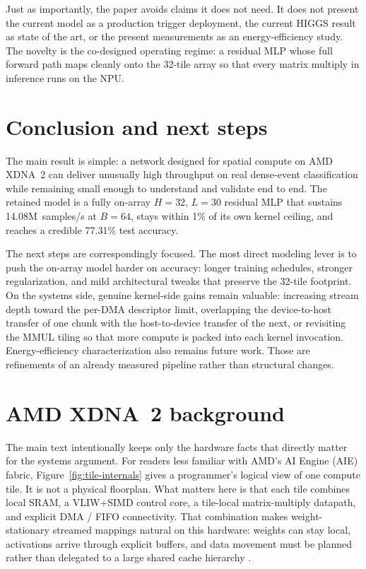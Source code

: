 \documentclass[a4paper,11pt]{article}
\begin{document}
Just as importantly, the paper avoids claims it does not need. It does not
present the current model as a production trigger deployment, the current HIGGS
result as state of the art, or the present measurements as an energy-efficiency
study. The novelty is the co-designed operating regime: a residual MLP whose
full forward path maps cleanly onto the 32-tile array so that every matrix
multiply in inference runs on the NPU.

\section{Conclusion and next steps}

The main result is simple: a network designed for spatial compute on AMD
XDNA~2 can deliver unusually high throughput on real dense-event
classification while remaining small enough to understand and validate end to
end. The retained model is a fully on-array $H=32$, $L=30$ residual MLP that
sustains 14.08M~samples/s at $B=64$, stays within 1\% of its own kernel
ceiling, and reaches a credible 77.31\% test accuracy.

The next steps are correspondingly focused. The most direct modeling lever is
to push the on-array model harder on accuracy: longer training schedules,
stronger regularization, and mild architectural tweaks that preserve the
32-tile footprint. On the systems side, genuine kernel-side gains remain
valuable: increasing stream depth toward the per-DMA descriptor limit,
overlapping the device-to-host transfer of one chunk with the host-to-device
transfer of the next, or revisiting the MMUL tiling so that more compute is
packed into each kernel invocation. Energy-efficiency characterization also
remains future work. Those are refinements of an already measured pipeline
rather than structural changes.

\clearpage
\appendix

\section{AMD XDNA~2 background}

The main text intentionally keeps only the hardware facts that directly matter
for the systems argument. For readers less familiar with AMD's AI Engine (AIE)
fabric, Figure~\ref{fig:tile-internals} gives a programmer's logical view of
one compute tile. It is not a physical floorplan. What matters here is that
each tile combines local SRAM, a VLIW+SIMD control core, a tile-local
matrix-multiply datapath, and explicit DMA / FIFO connectivity. That
combination makes weight-stationary streamed mappings natural on this hardware:
weights can stay local, activations arrive through explicit buffers, and data
movement must be planned rather than delegated to a large shared cache
hierarchy
\cite{amd-aie,amd-npu-linux}.
\end{document}
